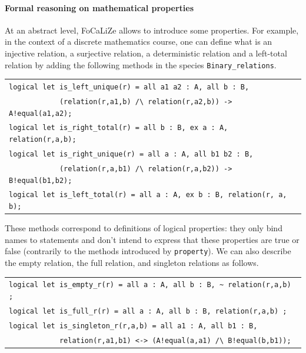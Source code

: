 \documentclass[submission,copyright,creativecommons]{eptcs}
\def\focalize{FoCaLiZe \mbox{}}
\begin{document}
\paragraph{Formal reasoning on mathematical properties}
At an abstract level, \focalize allows to introduce 
some properties. For example, in the context of a discrete mathematics
course, one can define what is an injective relation, a surjective
relation, a deterministic relation and a left-total relation by adding
the following methods in the species  {\footnotesize \tt Binary\_relations}.

\begin{center}
\begin{scriptsize}
\begin{tabular}{|l|}
\hline
\verb+logical let is_left_unique(r) = all a1 a2 : A, all b : B,+\\
\verb+            (relation(r,a1,b) /\ relation(r,a2,b)) -> A!equal(a1,a2);+\\
\verb+logical let is_right_total(r) = all b : B, ex a : A, relation(r,a,b);+\\
\verb+logical let is_right_unique(r) = all a : A, all b1 b2 : B,+\\
\verb+            (relation(r,a,b1) /\ relation(r,a,b2)) -> B!equal(b1,b2);+\\
\verb+logical let is_left_total(r) = all a : A, ex b : B, relation(r, a, b);+ \\
\hline
\end{tabular}
\end{scriptsize}
\end{center}

\noindent
These methods correspond to  definitions of logical properties: they only
bind names 
to statements and
don't intend to express that these properties are true or false (contrarily to the
methods introduced by {\footnotesize \tt property}).
We can also describe the empty relation, the full relation, and
singleton relations as follows.


\begin{center}
\begin{scriptsize}
\begin{tabular}{|l|}
\hline
\verb+logical let is_empty_r(r) = all a : A, all b : B, ~ relation(r,a,b) ;+\\
\verb+logical let is_full_r(r) = all a : A, all b : B, relation(r,a,b) ;+\\
\verb+logical let is_singleton_r(r,a,b) = all a1 : A, all b1 : B, +\\
\verb+            relation(r,a1,b1) <-> (A!equal(a,a1) /\ B!equal(b,b1));+\\
\hline
\end{tabular}
\end{scriptsize}
\end{center}
\end{document}
